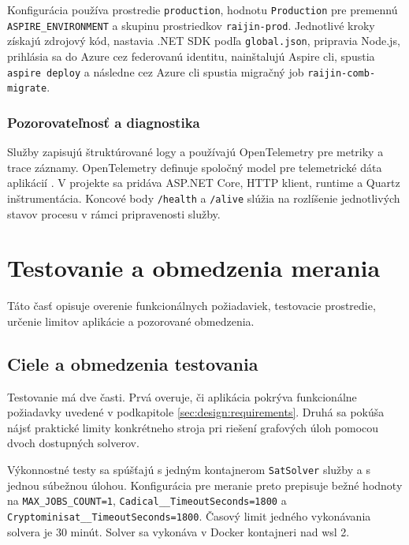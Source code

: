 Konfigurácia používa prostredie \texttt{production}, hodnotu \texttt{Production} pre premennú \texttt{ASPIRE\_ENVIRONMENT} a skupinu prostriedkov \texttt{raijin-prod}. Jednotlivé kroky získajú zdrojový kód, nastavia .NET SDK podľa \texttt{global.json}, pripravia Node.js, prihlásia sa do Azure cez federovanú identitu, nainštalujú Aspire \acrshort{cli}, spustia \texttt{aspire deploy} a následne cez Azure \acrshort{cli} spustia migračný job \texttt{raijin-comb-migrate}.

\subsubsection{Pozorovateľnosť a diagnostika}\label{sec:implementation:observability}
Služby zapisujú štruktúrované logy a používajú OpenTelemetry pre metriky a trace záznamy. OpenTelemetry definuje spoločný model pre telemetrické dáta aplikácií \cite{opentelemetry-overview}. V projekte sa pridáva ASP.NET Core, HTTP klient, runtime a Quartz inštrumentácia. Koncové body \texttt{/health} a \texttt{/alive} slúžia na rozlíšenie jednotlivých stavov procesu v rámci pripravenosti služby.

\section{Testovanie a obmedzenia merania}\label{sec:testing}
Táto časť opisuje overenie funkcionálnych požiadaviek, testovacie prostredie, určenie limitov aplikácie a pozorované obmedzenia.

\subsection{Ciele a obmedzenia testovania}\label{sec:testing:goals-limitations}
Testovanie má dve časti. Prvá overuje, či aplikácia pokrýva funkcionálne požiadavky uvedené v podkapitole \ref{sec:design:requirements}. Druhá sa pokúša nájsť praktické limity konkrétneho stroja pri riešení grafových úloh pomocou dvoch dostupných solverov.

Výkonnostné testy sa spúšťajú s jedným kontajnerom \texttt{SatSolver} služby a s jednou súbežnou úlohou. Konfigurácia pre meranie preto prepisuje bežné hodnoty na \texttt{MAX\_JOBS\_COUNT=1}, \texttt{Cadical\_\_TimeoutSeconds=1800} a \newline \texttt{Cryptominisat\_\_TimeoutSeconds=1800}. Časový limit jedného vykonávania solvera je 30 minút. Solver sa vykonáva v Docker kontajneri nad \acrfull{wsl} 2.

